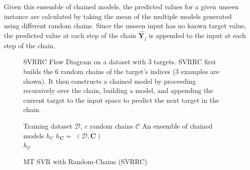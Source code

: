 \documentclass[reqno]{vcuthesis}
\numberwithin{equation}{chapter}
\begin{document}
Given this ensemble of chained models, the predicted values for a given unseen instance are calculated by taking the mean of the multiple models generated using different random chains. Since the unseen input has no known target value, the predicted value at each step of the chain $\hat{\bm Y}_j$ is appended to the input at each step of the chain. 
\begin{figure}[t]
\centering \small
\begin{minipage}{\textwidth}
\centering \small
{}
\end{minipage}
\caption{SVRRC Flow Diagram on a dataset with 3 targets. SVRRC first builds the $6$ random chains of the target's indices ($3$ examples are shown). It then constructs a chained model by proceeding recursively over the chain, building a model, and appending the current target to the input space to predict the next target in the chain. } \label{fig:svrrc}
\begin{algorithm}[H]
\caption{MT SVR with Random-Chains (SVRRC)}
\small \centering
\label{alg:SVRRC} 
\begin{algorithmic}[1]
\renewcommand{\algorithmicrequire}{\textbf{Input:}}
\renewcommand{\algorithmicensure}{\textbf{Output:}}
\Require Training dataset $\mathcal{D}$, $c$ random chains $\mathcal{C}$
\Ensure  An ensemble of chained models $h_\mathcal{C}$
 
\State $h_{\bm C} = $ $(\mathcal{D},\bm C)$ 
\EndFor \\
\Return $h_\mathcal{C}$ 
\end{algorithmic} 
\end{algorithm}
\end{figure}
\end{document}

